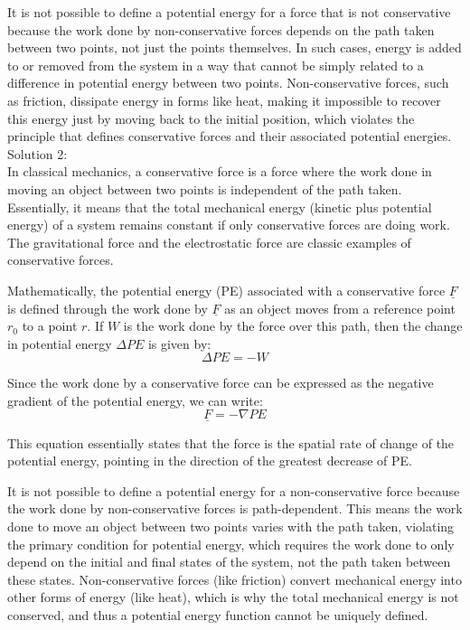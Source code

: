 \documentclass[a4paper,11pt]{article}
\begin{document}
It is not possible to define a potential energy for a force that is not conservative because the work done by non-conservative forces depends on the path taken between two points, not just the points themselves. In such cases, energy is added to or removed from the system in a way that cannot be simply related to a difference in potential energy between two points. Non-conservative forces, such as friction, dissipate energy in forms like heat, making it impossible to recover this energy just by moving back to the initial position, which violates the principle that defines conservative forces and their associated potential energies. \\

\noindent Solution 2: \\

In classical mechanics, a conservative force is a force where the work done in moving an object between two points is independent of the path taken. Essentially, it means that the total mechanical energy (kinetic plus potential energy) of a system remains constant if only conservative forces are doing work. The gravitational force and the electrostatic force are classic examples of conservative forces.

Mathematically, the potential energy (PE) associated with a conservative force \( \underline{F} \) is defined through the work done by \( \underline{F} \) as an object moves from a reference point \( r_0 \) to a point \( r \). If \( W \) is the work done by the force over this path, then the change in potential energy \( \Delta PE \) is given by:
\[ \Delta PE = -W \]

Since the work done by a conservative force can be expressed as the negative gradient of the potential energy, we can write:
\[ \underline{F} = -\nabla PE \]

This equation essentially states that the force is the spatial rate of change of the potential energy, pointing in the direction of the greatest decrease of PE.

It is not possible to define a potential energy for a non-conservative force because the work done by non-conservative forces is path-dependent. This means the work done to move an object between two points varies with the path taken, violating the primary condition for potential energy, which requires the work done to only depend on the initial and final states of the system, not the path taken between these states. Non-conservative forces (like friction) convert mechanical energy into other forms of energy (like heat), which is why the total mechanical energy is not conserved, and thus a potential energy function cannot be uniquely defined. \\
\end{document}
